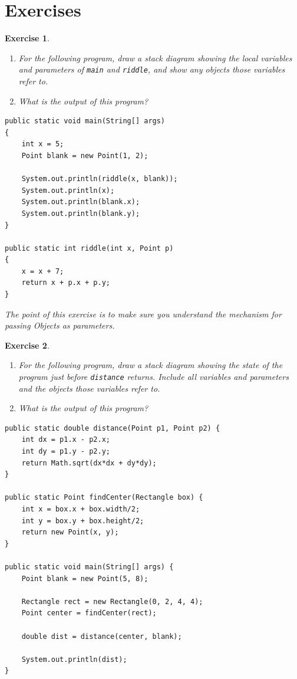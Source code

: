 \documentclass[12pt]{book}
\theoremstyle{exercise}
\newtheorem{exercise}{Exercise}[chapter]
\begin{document}
\section{Exercises}

\begin{exercise}
\begin{enumerate}

\item For the following program, draw a stack diagram showing the
local variables and parameters of {\tt main} and {\tt riddle}, and show
any objects those variables refer to.

\item What is the output of this program?

\end{enumerate}

\begin{lstlisting}
public static void main(String[] args)
{
    int x = 5;
    Point blank = new Point(1, 2);

    System.out.println(riddle(x, blank));
    System.out.println(x);
    System.out.println(blank.x);
    System.out.println(blank.y);
}

public static int riddle(int x, Point p)
{
    x = x + 7;
    return x + p.x + p.y;
}
\end{lstlisting}

The point of this exercise is to make sure you understand the
mechanism for passing Objects as parameters.
\end{exercise}


\begin{exercise}
\begin{enumerate}

\item For the following program, draw a stack diagram showing the
state of the program just before {\tt distance} returns.  Include all
variables and parameters and the objects those variables refer to.

\item What is the output of this program?

\end{enumerate}

\begin{lstlisting}
public static double distance(Point p1, Point p2) {
    int dx = p1.x - p2.x;
    int dy = p1.y - p2.y;
    return Math.sqrt(dx*dx + dy*dy);
}

public static Point findCenter(Rectangle box) {
    int x = box.x + box.width/2;
    int y = box.y + box.height/2;
    return new Point(x, y);
}

public static void main(String[] args) {
    Point blank = new Point(5, 8);

    Rectangle rect = new Rectangle(0, 2, 4, 4);
    Point center = findCenter(rect);

    double dist = distance(center, blank);

    System.out.println(dist);
}
\end{lstlisting}
%
\end{exercise}
\end{document}
